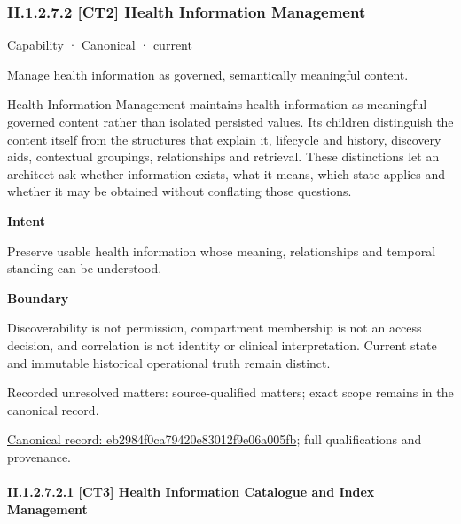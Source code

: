 \subsubsection*{II.1.2.7.2 [CT2] Health Information Management}
\label{navigation:II.1.2.7.2}

\label{element:eb2984f0ca79420e83012f9e06a005fb}
{\small Capability · Canonical · current}\par

Manage health information as governed, semantically meaningful content.



Health Information Management maintains health information as meaningful governed content rather than isolated persisted values. Its children distinguish the content itself from the structures that explain it, lifecycle and history, discovery aids, contextual groupings, relationships and retrieval. These distinctions let an architect ask whether information exists, what it means, which state applies and whether it may be obtained without conflating those questions.



\textbf{Intent}



Preserve usable health information whose meaning, relationships and temporal standing can be understood.



\textbf{Boundary}



Discoverability is not permission, compartment membership is not an access decision, and correlation is not identity or clinical interpretation. Current state and immutable historical operational truth remain distinct.


{\small Recorded unresolved matters: source-qualified matters; exact scope remains in the canonical record.}\par
{\footnotesize \href{../../../../../../../continuum/strategy/capability/eb2984f0ca79420e83012f9e06a005fb.md}{Canonical record: eb2984f0ca79420e83012f9e06a005fb}; full qualifications and provenance.}\par
\paragraph*{II.1.2.7.2.1 [CT3] Health Information Catalogue and Index Management}
\label{navigation:II.1.2.7.2.1}

